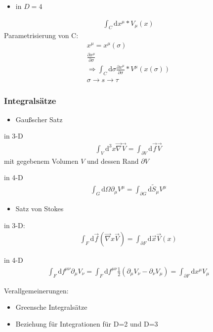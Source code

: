 \documentclass[a4paper]{article}
\begin{document}
\begin{itemize}
  \item in $D=4$
\end{itemize}
\begin{align}
\int_C \mathrm{d}x^\mu*V_\mu(x)
\end{align}
Parametrisierung von C:
\begin{align}
x^\mu=x^\mu(\sigma)\\
\frac{\partial x^\mu}{\partial\sigma}\\
\Rightarrow\int_C \mathrm{d}\sigma \frac{\partial x^\mu}{\partial\sigma}*
V^\mu(x(\sigma))\\
\sigma\rightarrow s \rightarrow\tau
\end{align}

\subsubsection{Integralsätze}
\begin{itemize}
  \item Gaußscher Satz
\end{itemize}
in 3-D
\begin{align}
\int_V \mathrm{d}^3x \vec\nabla \vec{V} = \int_{\partial V} \mathrm{d}\vec{f} \vec{V}
\end{align}
mit gegebenem Volumen $V$ und dessen Rand $\partial V$

in 4-D
\begin{align}
\int_G \mathrm{d}\Omega \partial_\mu V^\mu = \int_{\partial G} \mathrm{d}\tilde{S}_\mu V^\mu
\end{align}

\begin{itemize}
  \item Satz von Stokes
\end{itemize}

in 3-D:
\begin{align}
\int_F \mathrm{d}\vec{f} (\vec{\nabla}x\vec{V}) = \int_{\partial F} \mathrm{d}\vec{x} \vec{V}(x)
\end{align}

in 4-D
\begin{align}
\int_F \mathrm{d}f^{\mu\nu} \partial_\mu V_\nu= \int_F \mathrm{d}f^{\mu\nu}
\frac{1}{2}(\partial_\mu V_\nu-\partial_\nu V_\mu) = \int_{\partial F}
\mathrm{d}x^\mu V_\mu
\end{align}

Verallgemeinerungen:\\
\begin{itemize}
  \item Greensche Integralsätze
  \item Beziehung für Integrationen für D=2 und D=3  
\end{itemize}
\end{document}
